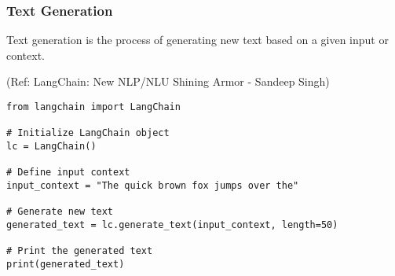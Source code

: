 \begin{frame}[fragile]\frametitle{Text Generation}

Text generation is the process of generating new text based on a given input or context. 

{\tiny (Ref: LangChain: New NLP/NLU Shining Armor - Sandeep Singh)}

\begin{lstlisting}
from langchain import LangChain

# Initialize LangChain object
lc = LangChain()

# Define input context
input_context = "The quick brown fox jumps over the"

# Generate new text
generated_text = lc.generate_text(input_context, length=50)

# Print the generated text
print(generated_text)
\end{lstlisting}	  

\end{frame}


